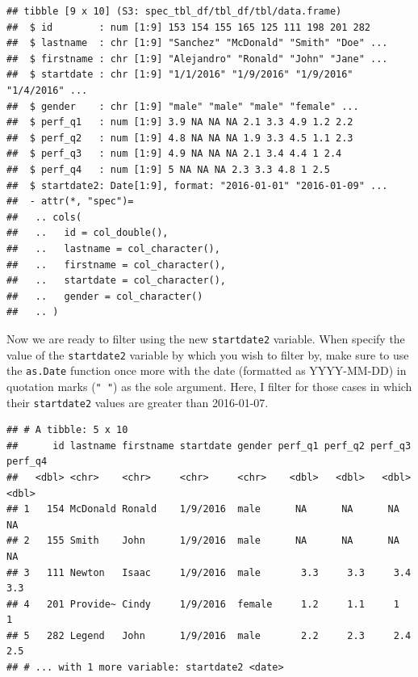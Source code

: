\documentclass[]{book}
\newenvironment{Shaded}{\begin{snugshade}}{\end{snugshade}}
\newcommand{\KeywordTok}[1]{\textcolor[rgb]{0.13,0.29,0.53}{\textbf{#1}}}
\newcommand{\StringTok}[1]{\textcolor[rgb]{0.31,0.60,0.02}{#1}}
\newcommand{\CommentTok}[1]{\textcolor[rgb]{0.56,0.35,0.01}{\textit{#1}}}
\newcommand{\OperatorTok}[1]{\textcolor[rgb]{0.81,0.36,0.00}{\textbf{#1}}}
\newcommand{\NormalTok}[1]{#1}
\begin{document}
\begin{verbatim}
## tibble [9 x 10] (S3: spec_tbl_df/tbl_df/tbl/data.frame)
##  $ id        : num [1:9] 153 154 155 165 125 111 198 201 282
##  $ lastname  : chr [1:9] "Sanchez" "McDonald" "Smith" "Doe" ...
##  $ firstname : chr [1:9] "Alejandro" "Ronald" "John" "Jane" ...
##  $ startdate : chr [1:9] "1/1/2016" "1/9/2016" "1/9/2016" "1/4/2016" ...
##  $ gender    : chr [1:9] "male" "male" "male" "female" ...
##  $ perf_q1   : num [1:9] 3.9 NA NA NA 2.1 3.3 4.9 1.2 2.2
##  $ perf_q2   : num [1:9] 4.8 NA NA NA 1.9 3.3 4.5 1.1 2.3
##  $ perf_q3   : num [1:9] 4.9 NA NA NA 2.1 3.4 4.4 1 2.4
##  $ perf_q4   : num [1:9] 5 NA NA NA 2.3 3.3 4.8 1 2.5
##  $ startdate2: Date[1:9], format: "2016-01-01" "2016-01-09" ...
##  - attr(*, "spec")=
##   .. cols(
##   ..   id = col_double(),
##   ..   lastname = col_character(),
##   ..   firstname = col_character(),
##   ..   startdate = col_character(),
##   ..   gender = col_character()
##   .. )
\end{verbatim}

Now we are ready to filter using the new \texttt{startdate2} variable.
When specify the value of the \texttt{startdate2} variable by which you
wish to filter by, make sure to use the \texttt{as.Date} function once
more with the date (formatted as YYYY-MM-DD) in quotation marks
(\texttt{"\ "}) as the sole argument. Here, I filter for those cases in
which their \texttt{startdate2} values are greater than 2016-01-07.

\begin{Shaded}
\end{Shaded}

\begin{verbatim}
## # A tibble: 5 x 10
##      id lastname firstname startdate gender perf_q1 perf_q2 perf_q3 perf_q4
##   <dbl> <chr>    <chr>     <chr>     <chr>    <dbl>   <dbl>   <dbl>   <dbl>
## 1   154 McDonald Ronald    1/9/2016  male      NA      NA      NA      NA  
## 2   155 Smith    John      1/9/2016  male      NA      NA      NA      NA  
## 3   111 Newton   Isaac     1/9/2016  male       3.3     3.3     3.4     3.3
## 4   201 Provide~ Cindy     1/9/2016  female     1.2     1.1     1       1  
## 5   282 Legend   John      1/9/2016  male       2.2     2.3     2.4     2.5
## # ... with 1 more variable: startdate2 <date>
\end{verbatim}
\end{document}
